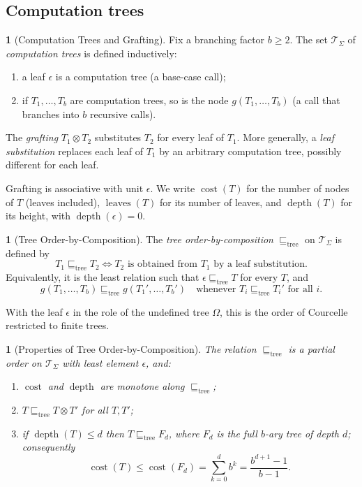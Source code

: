 \documentclass[oneside,english]{amsart}
\numberwithin{equation}{section}
\numberwithin{figure}{section}
\theoremstyle{plain}
\theoremstyle{definition}
\newtheorem{defn}[thm]{\protect\definitionname}
\theoremstyle{plain}
\newtheorem{prop}[thm]{\protect\propositionname}
\theoremstyle{remark}
\theoremstyle{plain}
\theoremstyle{definition}
\theoremstyle{plain}
\theoremstyle{remark}
\DeclareMathOperator{\cost}{cost}
\DeclareMathOperator{\depth}{depth}
\DeclareMathOperator{\leaves}{leaves}
\providecommand{\definitionname}{Definition}
\providecommand{\propositionname}{Proposition}
\begin{document}
\subsection{Computation trees}

\begin{defn}[Computation Trees and Grafting]\label{def:tree-algebra}
Fix a branching factor $b \ge 2$. The set $\mathcal{T}_\Sigma$ of \textit{computation trees} is defined inductively:
\begin{enumerate}
    \item a leaf $\epsilon$ is a computation tree (a base-case call);
    \item if $T_1, \dots, T_b$ are computation trees, so is the node $g(T_1, \dots, T_b)$ (a call that branches into $b$ recursive calls).
\end{enumerate}
The \textit{grafting} $T_1 \otimes T_2$ substitutes $T_2$ for every leaf of $T_1$. More generally, a \textit{leaf substitution} replaces each leaf of $T_1$ by an arbitrary computation tree, possibly different for each leaf.
\end{defn}

Grafting is associative with unit $\epsilon$. We write $\cost(T)$ for the number of nodes of $T$ (leaves included), $\leaves(T)$ for its number of leaves, and $\depth(T)$ for its height, with $\depth(\epsilon) = 0$.

\begin{defn}[Tree Order-by-Composition]\label{def:tree-order}
The \textit{tree order-by-composition} $\sqsubseteq_{\text{tree}}$ on $\mathcal{T}_\Sigma$ is defined by
\[
T_1 \sqsubseteq_{\text{tree}} T_2 \iff T_2 \text{ is obtained from } T_1 \text{ by a leaf substitution.}
\]
Equivalently, it is the least relation such that $\epsilon \sqsubseteq_{\text{tree}} T$ for every $T$, and
\[
g(T_1, \dots, T_b) \sqsubseteq_{\text{tree}} g(T_1', \dots, T_b') \quad \text{whenever } T_i \sqsubseteq_{\text{tree}} T_i' \text{ for all } i.
\]
\end{defn}
With the leaf $\epsilon$ in the role of the undefined tree $\Omega$, this is the order of Courcelle \cite[Section~2.4]{courcelle1983trees} restricted to finite trees.

\begin{prop}[Properties of Tree Order-by-Composition]\label{prop:tree-order-properties}
The relation $\sqsubseteq_{\text{tree}}$ is a partial order on $\mathcal{T}_\Sigma$ with least element $\epsilon$, and:
\begin{enumerate}
    \item $\cost$ and $\depth$ are monotone along $\sqsubseteq_{\text{tree}}$;
    \item $T \sqsubseteq_{\text{tree}} T \otimes T'$ for all $T, T'$;
    \item if $\depth(T) \le d$ then $T \sqsubseteq_{\text{tree}} F_d$, where $F_d$ is the full $b$-ary tree of depth $d$; consequently
    \[
    \cost(T) \le \cost(F_d) = \sum_{k=0}^d b^k = \frac{b^{d+1}-1}{b-1}.
    \]
\end{enumerate}
\end{prop}
\end{document}

